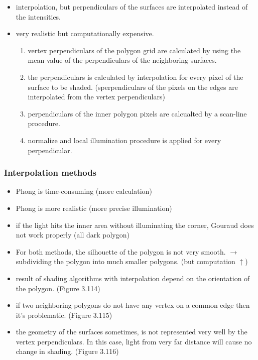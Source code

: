 \documentclass{standalone}
\begin{document}
\begin{itemize}
	\item interpolation, but perpendiculars of the surfaces are interpolated instead of the intensities.
	\item very realistic but computationally expensive.
		\begin{enumerate}
			\item vertex perpendiculars of the polygon grid are calculated by using the mean value of the perpendiculars of the neighboring surfaces. 
			\item the perpendiculars is calculated by interpolation for every pixel of the surface to be shaded. (sperpendiculars of the pixels on the edges are interpolated from the vertex perpendiculars)
			\item perpendiculars of the inner polygon pixels are calcualted by a scan-line procedure.
			\item normalize and local illumination procedure is applied for every perpendicular. 
		\end{enumerate}
\end{itemize}

\subsubsection*{Interpolation methods}

\begin{itemize}
	\item Phong is time-consuming (more calculation)
	\item Phong is more realistic (more precise illumination)
	\item if the light hits the inner area without illuminating the corner, Gouraud does not work properly (all dark polygon)
	\item For both methods, the silhouette of the polygon is not very smooth. $\rightarrow$ subdividing the polygon into much smaller polygons. (but computation $\uparrow$)
	\item result of shading algorithms with interpolation depend on the orientation of the polygon. (Figure 3.114)
	\item if two neighboring polygons do not have any vertex on a common edge then it's problematic. (Figure 3.115)
	\item the geometry of the surfaces sometimes, is not represented very well by the vertex perpendiculars. In this case, light from very far distance will cause no change in shading. (Figure 3.116)
\end{itemize}
\end{document}
